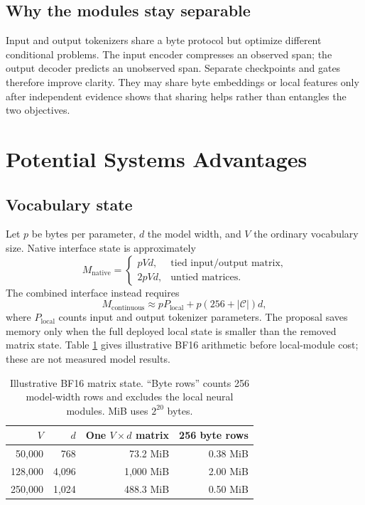 \documentclass[10pt,twocolumn]{article}
\newcommand{\controls}{\mathcal{C}}
\begin{document}
\subsection{Why the modules stay separable}

Input and output tokenizers share a byte protocol but optimize different conditional problems.
The input encoder compresses an observed span; the output decoder predicts an unobserved span.
Separate checkpoints and gates therefore improve clarity. They may share byte embeddings or local
features only after independent evidence shows that sharing helps rather than entangles the two
objectives.

\section{Potential Systems Advantages}

\subsection{Vocabulary state}

Let $p$ be bytes per parameter, $d$ the model width, and $V$ the ordinary vocabulary size. Native
interface state is approximately
\begin{equation}
M_{\mathrm{native}} =
\begin{cases}
pVd, & \text{tied input/output matrix},\\
2pVd, & \text{untied matrices}.
\end{cases}
\end{equation}
The combined interface instead requires
\begin{equation}
M_{\mathrm{continuous}} \approx pP_{\mathrm{local}} + p(256+|\controls|)d,
\end{equation}
where $P_{\mathrm{local}}$ counts input and output tokenizer parameters. The proposal saves memory
only when the full deployed local state is smaller than the removed matrix state. Table
\ref{tab:state} gives illustrative BF16 arithmetic before local-module cost; these are not measured
model results.

\begin{table}[t]
\centering
\caption{Illustrative BF16 matrix state. ``Byte rows'' counts 256 model-width rows and excludes the
local neural modules. MiB uses $2^{20}$ bytes.}
\label{tab:state}
\small
\begin{tabular}{@{}r r r r@{}}
\toprule
$V$ & $d$ & One $V\!\times\!d$ matrix & 256 byte rows \\
\midrule
50,000  & 768   & 73.2 MiB  & 0.38 MiB \\
128,000 & 4,096 & 1,000 MiB & 2.00 MiB \\
250,000 & 1,024 & 488.3 MiB & 0.50 MiB \\
\bottomrule
\end{tabular}
\end{table}
\end{document}
